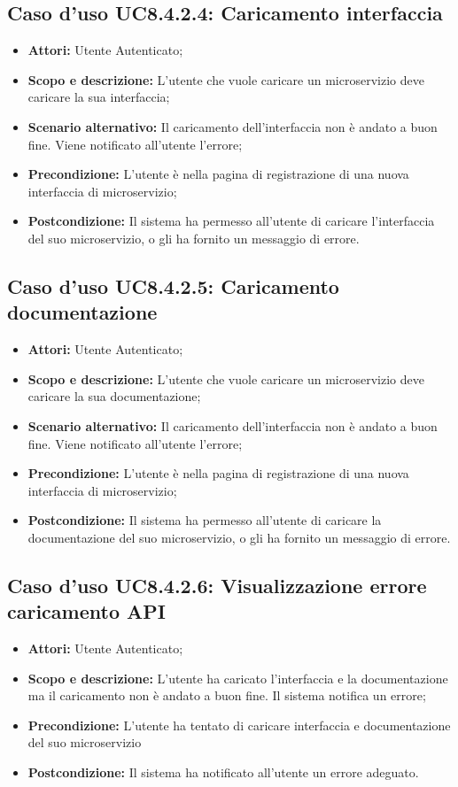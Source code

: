 \documentclass[12pt,a4paper,titlepage]{article}
\begin{document}
	\subsection{Caso d'uso UC8.4.2.4: Caricamento interfaccia}
	\label{UC8.4.2.4}
	\begin{itemize}
		\item \textbf{Attori: }Utente Autenticato;
		\item \textbf{Scopo e descrizione: }L'utente che vuole caricare un microservizio deve caricare la sua interfaccia;
		\item \textbf{Scenario alternativo: }Il caricamento dell'interfaccia non è andato a buon fine. Viene notificato all'utente l'errore;
		\item \textbf{Precondizione: }L'utente è nella pagina di registrazione di una nuova interfaccia di microservizio;
		\item \textbf{Postcondizione: }Il sistema ha permesso all'utente di caricare l'interfaccia del suo microservizio, o gli ha fornito un messaggio di errore.
	\end{itemize}
	\subsection{Caso d'uso UC8.4.2.5: Caricamento documentazione}
	\label{UC8.4.2.5}
	\begin{itemize}
		\item \textbf{Attori: }Utente Autenticato;
		\item \textbf{Scopo e descrizione: }L'utente che vuole caricare un microservizio deve caricare la sua documentazione;
		\item \textbf{Scenario alternativo: }Il caricamento dell'interfaccia non è andato a buon fine. Viene notificato all'utente l'errore;
		\item \textbf{Precondizione: }L'utente è nella pagina di registrazione di una nuova interfaccia di microservizio;
		\item \textbf{Postcondizione: }Il sistema ha permesso all'utente di caricare la documentazione del suo microservizio, o gli ha fornito un messaggio di errore.
	\end{itemize}
	\subsection{Caso d'uso UC8.4.2.6: Visualizzazione errore caricamento API}
	\label{UC8.4.2.6}
	\begin{itemize}
		\item \textbf{Attori: }Utente Autenticato;
		\item \textbf{Scopo e descrizione: }L'utente ha caricato l'interfaccia e la documentazione ma il caricamento non è andato a buon fine. Il sistema notifica un errore;
		\item \textbf{Precondizione: }L'utente ha tentato di caricare interfaccia e documentazione del suo microservizio
		\item \textbf{Postcondizione: }Il sistema ha notificato all'utente un errore adeguato.
	\end{itemize}
\end{document}

